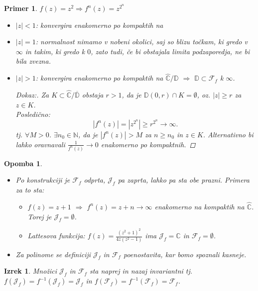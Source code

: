 \documentclass{article}
\newtheorem{opomba}{Opomba}
\newtheorem{primer}{Primer}
\newtheorem{izrek}{Izrek}
\newcommand{\C}{\mathbb{C}}
\newcommand{\D}{\mathbb{D}}
\newcommand{\N}{\mathbb{N}}
\newcommand{\F}{\mathcal{F}}
\begin{document}
\begin{primer}
$f(z) = z^2 \Longrightarrow f^n(z) = z^{2^n}$
\begin{itemize}
    \item  $|z| < 1$: konvergira enakomerno po kompaktih na 
    \item $|z| = 1$: normalnost nimamo v nobeni okolici, saj so blizu točkam, ki gredo v $\infty$ in takim, ki gredo k $0$, zato tudi, če bi obstajala limita podzaporedja, ne bi bila zvezna. 
    \item $|z| > 1$: konvergira enakomerno po kompaktih na $\hat{\C}\slash\D$ $\Longrightarrow$ $\D \subset \F_f$ k $\infty$.
    \begin{proof}[Dokaz:]
    Za $K \subset \hat{\C} \slash \overline{\D}$ obstaja $r > 1$, da je $\D(0, r) \cap K = \emptyset$, oz. $|z| \geq r$ za $z\in K$. \\ 
    Posledično:
    $$
    |f^n(z)| = |z^{2^n}| \geq r^{2^n} \rightarrow \infty.
    $$ 
    tj. $\forall M > 0$. $\exists n_0 \in \N$, da je $|f^n(z)| > M$ za $n \geq n_0$ in $z\in K$. Alternativno bi lahko oravnavali $\frac{1}{f^n(z)} \rightarrow 0$ enakomerno po kompaktnih. 
\end{proof}
\end{itemize}
\end{primer}


\begin{opomba}
\hfill
\begin{itemize}
\item Po konstrukciji je $\F_f$ odprta, $\mathcal{J}_f$ pa zaprta, lahko pa sta obe prazni. Primera za to sta:
\begin{itemize}
\item $f(z) = z + 1$ $\Longrightarrow$ $f^n(z) = z + n \longrightarrow \infty$ enakomerno na kompaktih na $\hat{\C}$. Torej je $\mathcal{J}_f = \emptyset$.
\item Lattesova funkcija: $f(z) = \frac{(z^2 + 1)^2}{4z(z^2 - 1)}$ ima $\mathcal{J}_f = \hat{\C}$ in $\F_f = \emptyset$.
\end{itemize}
\item Za polinome se definiciji $\mathcal{J}_f$ in $\F_f$ poenostavita, kar bomo spoznali kasneje.
\end{itemize}
\end{opomba}

\begin{izrek}
Množici $\mathcal{J}_f$ in $\F_f$ sta naprej in nazaj invariantni tj. $f(\mathcal{J}_f) = f^{-1}(\mathcal{J}_f) = \mathcal{J}_f$ in $f(\mathcal{F}_f) = f^{-1}(\mathcal{F}_f) = \mathcal{F}_f$.
\end{izrek}
\end{document}
